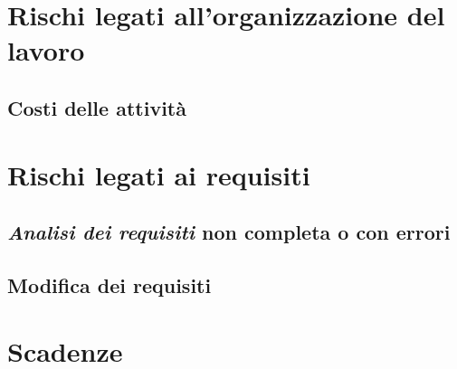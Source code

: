 \documentclass[PianoDiProgetto.tex]{subfiles}
\begin{document}
\section{Rischi legati all'organizzazione del lavoro}
\subsection{Costi delle attività}

\section{Rischi legati ai requisiti}
\subsection{\textit{Analisi dei requisiti} non completa o con errori}
\subsection{Modifica dei requisiti}

\section{Scadenze}
\end{document}
